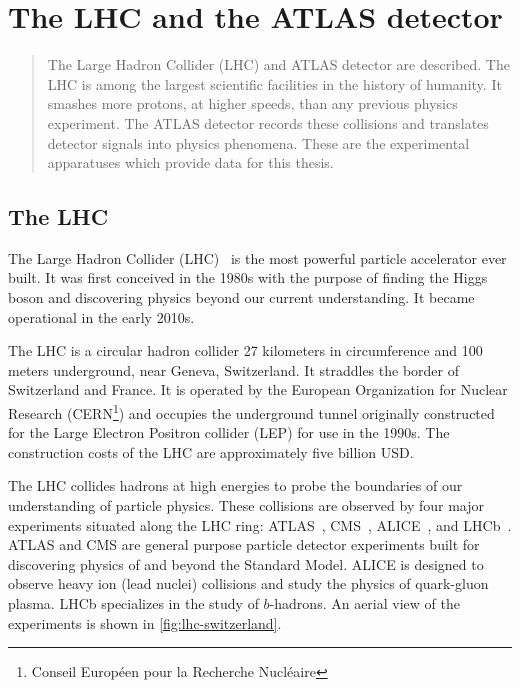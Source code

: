 \chapter[The LHC and the ATLAS detector][The LHC and the ATLAS detector]{The LHC and the ATLAS detector}
\label{chap:lhcatlas}

\begin{quote}
  The Large Hadron Collider (LHC) and ATLAS detector are described. The LHC is among the largest scientific facilities in the history of humanity. It smashes more protons, at higher speeds, than any previous physics experiment. The ATLAS detector records these collisions and translates detector signals into physics phenomena. These are the experimental apparatuses which provide data for this thesis.
\end{quote}
 
\section{The LHC}
\label{sec:lhc}

The Large Hadron Collider (LHC)~\cite{cern-jinst-lhc} is the most powerful particle accelerator ever built. It was first conceived in the 1980s with the purpose of finding the Higgs boson and discovering physics beyond our current understanding. It became operational in the early 2010s.

The LHC is a circular hadron collider 27 kilometers in circumference and 100 meters underground, near Geneva, Switzerland. It straddles the border of Switzerland and France. It is operated by the European Organization for Nuclear Research (CERN\footnote{Conseil Europ\'een pour la Recherche Nucl\'eaire}) and occupies the underground tunnel originally constructed for the Large Electron Positron collider (LEP) for use in the 1990s. The construction costs of the LHC are approximately five billion USD.

The LHC collides hadrons at high energies to probe the boundaries of our understanding of particle physics. These collisions are observed by four major experiments situated along the LHC ring: ATLAS~\cite{cern-jinst-atlas}, CMS~\cite{cern-jinst-cms}, ALICE~\cite{cern-jinst-alice}, and LHCb~\cite{cern-jinst-lhcb}. ATLAS and CMS are general purpose particle detector experiments built for discovering physics of and beyond the Standard Model. ALICE is designed to observe heavy ion (lead nuclei) collisions and study the physics of quark-gluon plasma. LHCb specializes in the study of $b$-hadrons. An aerial view of the experiments is shown in \cref{fig:lhc-switzerland}.

